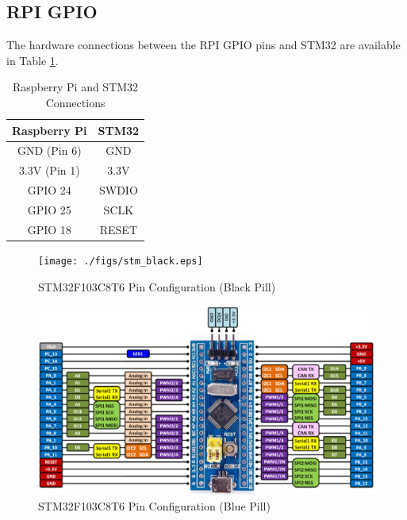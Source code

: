 \documentclass[journal,12pt,twocolumn]{IEEEtran}
\begin{document}
\subsection{RPI GPIO}
The hardware connections between the RPI GPIO pins and STM32 are available in Table \ref{table:raspstm}.
\begin{table}[!h]
\centering
\begin{tabular}{|c|c|}
\hline
\textbf{Raspberry Pi} & \textbf{STM32} \\ \hline
GND (Pin 6)           & GND            \\ \hline
3.3V (Pin 1)          & 3.3V           \\ \hline
GPIO 24               & SWDIO           \\ \hline
GPIO 25               & SCLK           \\ \hline
GPIO 18               & RESET          \\ \hline
\end{tabular}%
\caption{Raspberry Pi and STM32 Connections}
\label{table:raspstm}
\end{table}

\begin{figure}[!h]
\centering
\texttt{[image: ./figs/stm\_black.eps]}
\caption{STM32F103C8T6 Pin Configuration (Black Pill)}
\label{fig:stm_black}
\end{figure}
%
\begin{figure}[!h]
\centering
\includegraphics[width=\columnwidth]{./figs/stm_blue.eps}
\caption{STM32F103C8T6 Pin Configuration (Blue Pill)}
\label{fig:stm_blue}
\end{figure}
%
\end{document}
